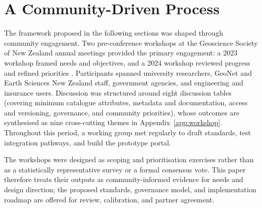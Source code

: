 \documentclass[11pt]{article}
\begin{document}
\section{A Community-Driven Process}
The framework proposed in the following sections was shaped through community engagement. Two pre-conference workshops at the Geoscience Society of New Zealand annual meetings provided the primary engagement: a 2023 workshop framed needs and objectives, and a 2024 workshop reviewed progress and refined priorities \citep{GSNZWorkshop2023, GSNZWorkshop2024}. Participants spanned university researchers, GeoNet and Earth Sciences New Zealand staff, government agencies, and engineering and insurance users. Discussion was structured around eight discussion tables (covering minimum catalogue attributes, metadata and documentation, access and versioning, governance, and community priorities), whose outcomes are synthesised as nine cross-cutting themes in Appendix~\ref{app:workshop}. Throughout this period, a working group met regularly to draft standards, test integration pathways, and build the prototype portal.

The workshops were designed as scoping and prioritisation exercises rather than as a statistically representative survey or a formal consensus vote. This paper therefore treats their outputs as community-informed evidence for needs and design direction; the proposed standards, governance model, and implementation roadmap are offered for review, calibration, and partner agreement.
\end{document}
